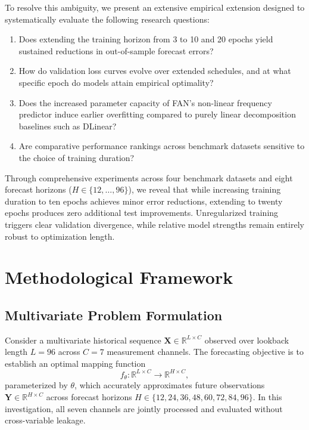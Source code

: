 \documentclass[journal]{IEEEtran}
\begin{document}
To resolve this ambiguity, we present an extensive empirical extension designed to systematically evaluate the following research questions:
\begin{enumerate}
    \item Does extending the training horizon from 3 to 10 and 20 epochs yield sustained reductions in out-of-sample forecast errors?
    \item How do validation loss curves evolve over extended schedules, and at what specific epoch do models attain empirical optimality?
    \item Does the increased parameter capacity of FAN's non-linear frequency predictor induce earlier overfitting compared to purely linear decomposition baselines such as DLinear?
    \item Are comparative performance rankings across benchmark datasets sensitive to the choice of training duration?
\end{enumerate}

Through comprehensive experiments across four benchmark datasets and eight forecast horizons ($H \in \{12, \dots, 96\}$), we reveal that while increasing training duration to ten epochs achieves minor error reductions, extending to twenty epochs produces zero additional test improvements. Unregularized training triggers clear validation divergence, while relative model strengths remain entirely robust to optimization length.

\section{Methodological Framework}

\subsection{Multivariate Problem Formulation}
Consider a multivariate historical sequence $\mathbf{X} \in \mathbb{R}^{L \times C}$ observed over lookback length $L=96$ across $C=7$ measurement channels. The forecasting objective is to establish an optimal mapping function
\begin{equation}
f_\theta : \mathbb{R}^{L \times C} \longrightarrow \mathbb{R}^{H \times C},
\end{equation}
parameterized by $\theta$, which accurately approximates future observations $\mathbf{Y} \in \mathbb{R}^{H \times C}$ across forecast horizons $H \in \{12, 24, 36, 48, 60, 72, 84, 96\}$. In this investigation, all seven channels are jointly processed and evaluated without cross-variable leakage.
\end{document}
